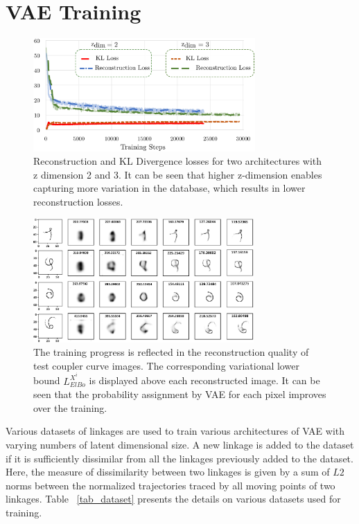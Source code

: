 \section{VAE Training}

\begin{figure}
\centering
\includegraphics[width=240pt]{jmd-19/figure/fig_vae_train_loss.eps}
  \caption{Reconstruction and KL Divergence losses for two architectures with z dimension 2 and 3. It can be seen that higher z-dimension enables capturing more variation in the database, which results in lower reconstruction losses.}
\label{fig_vae_training_loss}
\end{figure}


\begin{figure}[t]
\centering
\includegraphics[width=0.75\textwidth]{idetc-20/figure/training_testing.eps}
  \caption{The training progress is reflected in the reconstruction quality of test coupler curve images. The corresponding variational lower bound $L_{ElBo}^{X^i}$ is displayed above each reconstructed image. It can be seen that the probability assignment by VAE for each pixel improves over the training.}
\label{fig_training_reconstructions}
\end{figure}

Various datasets of linkages are used to train various architectures of VAE with varying numbers of latent dimensional size. A new linkage is added to the dataset if it is sufficiently dissimilar from all the linkages previously added to the dataset.
Here, the measure of dissimilarity between two linkages is given by a sum of $L2$ norms between the normalized trajectories traced by all moving points of two linkages.
Table ~\ref{tab_dataset} presents the details on various datasets used for training.

